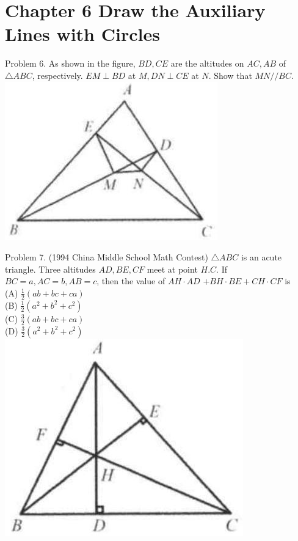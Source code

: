 \documentclass[10pt]{article}
\begin{document}
\section*{Chapter 6 Draw the Auxiliary Lines with Circles}
Problem 6. As shown in the figure, \(B D, C E\) are the altitudes on \(A C, A B\) of \(\triangle A B C\), respectively. \(E M \perp B D\) at \(M, D N \perp C E\) at \(N\). Show that \(M N / / B C\).\\
\includegraphics[max width=\textwidth, center]{2025_04_17_97bc1f7e44d93c271a88g-207(3)}

Problem 7. (1994 China Middle School Math Contest) \(\triangle A B C\) is an acute triangle. Three altitudes \(A D, B E, C F\) meet at point \(H . C\). If \(B C=a, A C=b, A B=c\), then the value of \(A H \cdot A D\) \(+B H \cdot B E+C H \cdot C F\) is\\
(A) \(\frac{1}{2}(a b+b c+c a)\)\\
(B) \(\frac{1}{2}\left(a^{2}+b^{2}+c^{2}\right)\)\\
(C) \(\frac{3}{2}(a b+b c+c a)\)\\
(D) \(\frac{3}{2}\left(a^{2}+b^{2}+c^{2}\right)\)\\
\includegraphics[max width=\textwidth, center]{2025_04_17_97bc1f7e44d93c271a88g-207(1)}
\end{document}
